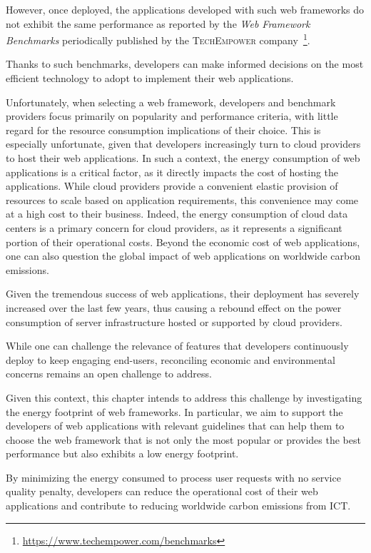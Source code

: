However, once deployed, the applications developed with such web frameworks do not exhibit the same performance as reported by the \emph{Web Framework Benchmarks} periodically published by the \textsc{TechEmpower} company~\footnote{\url{https://www.techempower.com/benchmarks}}.

Thanks to such benchmarks, developers can make informed decisions on the most efficient technology to adopt to implement their web applications.

Unfortunately, when selecting a web framework, developers and benchmark providers focus primarily on popularity and performance criteria, with little regard for the resource consumption implications of their choice.
This is especially unfortunate, given that developers increasingly turn to cloud providers to host their web applications.
In such a context, the energy consumption of web applications is a critical factor, as it directly impacts the cost of hosting the applications.
While cloud providers provide a convenient elastic provision of resources to scale based on application requirements, this convenience may come at a high cost to their business.
Indeed, the energy consumption of cloud data centers is a primary concern for cloud providers, as it represents a significant portion of their operational costs.
Beyond the economic cost of web applications, one can also question the global impact of web applications on worldwide carbon emissions.

Given the tremendous success of web applications, their deployment has severely increased over the last few years, thus causing a rebound effect on the power consumption of server infrastructure hosted or supported by cloud providers.

While one can challenge the relevance of features that developers continuously deploy to keep engaging end-users, reconciling economic and environmental concerns remains an open challenge to address.

Given this context, this chapter intends to address this challenge by investigating the energy footprint of web frameworks.
In particular, we aim to support the developers of web applications with relevant guidelines that can help them to choose the web framework that is not only the most popular or provides the best performance but also exhibits a low energy footprint.

By minimizing the energy consumed to process user requests with no service quality penalty, developers can reduce the operational cost of their web applications and contribute to reducing worldwide carbon emissions from ICT.

